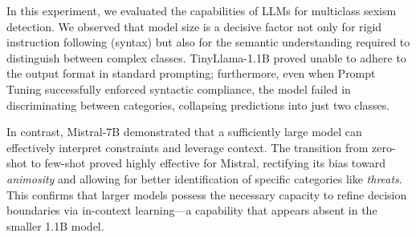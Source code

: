 \documentclass[11pt]{article}
\begin{document}

In this experiment, we evaluated the capabilities of LLMs for multiclass sexism detection. We observed that model size is a decisive factor not only for rigid instruction following (syntax) but also for the semantic understanding required to distinguish between complex classes. TinyLlama-1.1B proved unable to adhere to the output format in standard prompting; furthermore, even when Prompt Tuning successfully enforced syntactic compliance, the model failed in discriminating between categories, collapsing predictions into just two classes.

In contrast, Mistral-7B demonstrated that a sufficiently large model can effectively interpret constraints and leverage context. The transition from zero-shot to few-shot proved highly effective for Mistral, rectifying its bias toward \textit{animosity} and allowing for better identification of specific categories like \textit{threats}. This confirms that larger models possess the necessary capacity to refine decision boundaries via in-context learning—a capability that appears absent in the smaller 1.1B model.


\label{sec:links}






\end{document}
